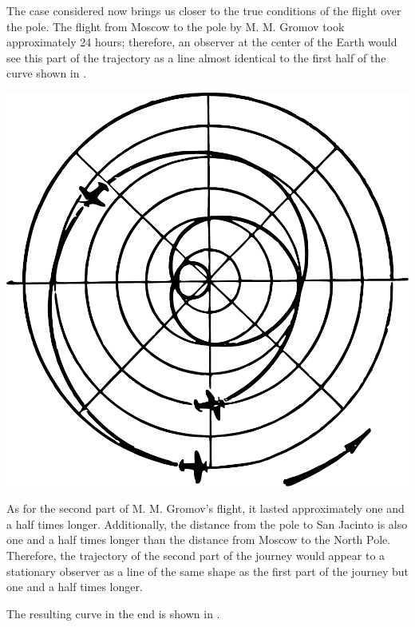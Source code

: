 The case considered now brings us closer to the true conditions of the flight over the pole. The flight from Moscow to the pole by M. M. Gromov took approximately 24 hours; therefore, an observer at the center of the Earth would see this part of the trajectory as a line almost identical to the first half of the curve shown in . 

\begin{marginfigure}[-1cm]%
\centering
\includegraphics[width=\textwidth]{figures/ch-09/fig-138.pdf}
\end{marginfigure}


As for the second part of M. M. Gromov's flight, it lasted approximately one and a half times longer. Additionally, the distance from the pole to San Jacinto is also one and a half times longer than the distance from Moscow to the North Pole. Therefore, the trajectory of the second part of the journey would appear to a stationary observer as a line of the same shape as the first part of the journey but one and a half times longer.




The resulting curve in the end is shown in .

